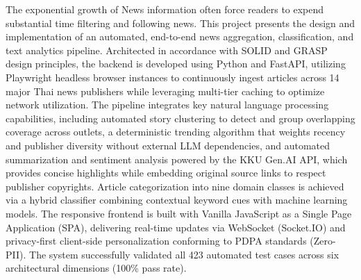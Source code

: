 The exponential growth of News information often force readers to expend substantial time filtering and following news. This project presents the design and implementation of an automated, end-to-end news aggregation, classification, and text analytics pipeline. Architected in accordance with SOLID and GRASP design principles, the backend is developed using Python and FastAPI, utilizing Playwright headless browser instances to continuously ingest articles across 14 major Thai news publishers while leveraging multi-tier caching to optimize network utilization. The pipeline integrates key natural language processing capabilities, including automated story clustering to detect and group overlapping coverage across outlets, a deterministic trending algorithm that weights recency and publisher diversity without external LLM dependencies, and automated summarization and sentiment analysis powered by the KKU Gen.AI API, which provides concise highlights while embedding original source links to respect publisher copyrights. Article categorization into nine domain classes is achieved via a hybrid classifier combining contextual keyword cues with machine learning models. The responsive frontend is built with Vanilla JavaScript as a Single Page Application (SPA), delivering real-time updates via WebSocket (Socket.IO) and privacy-first client-side personalization conforming to PDPA standards (Zero-PII). The system successfully validated all 423 automated test cases across six architectural dimensions (100\% pass rate).